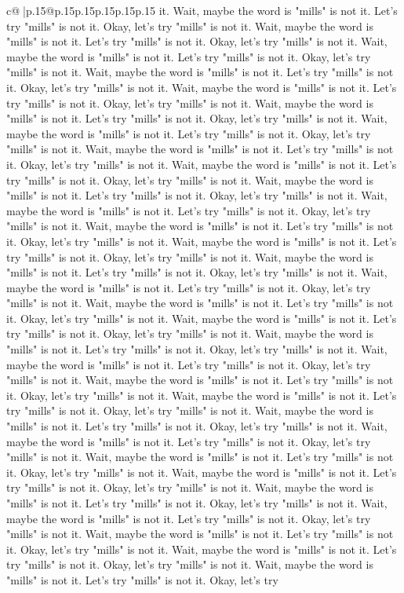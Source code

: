 \documentclass{article}
\begin{document}
{\begin{supertabular}{c@{$\;$}|p{.15\linewidth}@{}p{.15\linewidth}p{.15\linewidth}p{.15\linewidth}p{.15\linewidth}p{.15\linewidth}}
{{{it. Wait, maybe the word is "mills" is not it. Let's try "mills" is not it. Okay, let's try "mills" is not it. Wait, maybe the word is "mills" is not it. Let's try "mills" is not it. Okay, let's try "mills" is not it. Wait, maybe the word is "mills" is not it. Let's try "mills" is not it. Okay, let's try "mills" is not it. Wait, maybe the word is "mills" is not it. Let's try "mills" is not it. Okay, let's try "mills" is not it. Wait, maybe the word is "mills" is not it. Let's try "mills" is not it. Okay, let's try "mills" is not it. Wait, maybe the word is "mills" is not it. Let's try "mills" is not it. Okay, let's try "mills" is not it. Wait, maybe the word is "mills" is not it. Let's try "mills" is not it. Okay, let's try "mills" is not it. Wait, maybe the word is "mills" is not it. Let's try "mills" is not it. Okay, let's try "mills" is not it. Wait, maybe the word is "mills" is not it. Let's try "mills" is not it. Okay, let's try "mills" is not it. Wait, maybe the word is "mills" is not it. Let's try "mills" is not it. Okay, let's try "mills" is not it. Wait, maybe the word is "mills" is not it. Let's try "mills" is not it. Okay, let's try "mills" is not it. Wait, maybe the word is "mills" is not it. Let's try "mills" is not it. Okay, let's try "mills" is not it. Wait, maybe the word is "mills" is not it. Let's try "mills" is not it. Okay, let's try "mills" is not it. Wait, maybe the word is "mills" is not it. Let's try "mills" is not it. Okay, let's try "mills" is not it. Wait, maybe the word is "mills" is not it. Let's try "mills" is not it. Okay, let's try "mills" is not it. Wait, maybe the word is "mills" is not it. Let's try "mills" is not it. Okay, let's try "mills" is not it. Wait, maybe the word is "mills" is not it. Let's try "mills" is not it. Okay, let's try "mills" is not it. Wait, maybe the word is "mills" is not it. Let's try "mills" is not it. Okay, let's try "mills" is not it. Wait, maybe the word is "mills" is not it. Let's try "mills" is not it. Okay, let's try "mills" is not it. Wait, maybe the word is "mills" is not it. Let's try "mills" is not it. Okay, let's try "mills" is not it. Wait, maybe the word is "mills" is not it. Let's try "mills" is not it. Okay, let's try "mills" is not it. Wait, maybe the word is "mills" is not it. Let's try "mills" is not it. Okay, let's try "mills" is not it. Wait, maybe the word is "mills" is not it. Let's try "mills" is not it. Okay, let's try "mills" is not it. Wait, maybe the word is "mills" is not it. Let's try "mills" is not it. Okay, let's try "mills" is not it. Wait, maybe the word is "mills" is not it. Let's try "mills" is not it. Okay, let's try "mills" is not it. Wait, maybe the word is "mills" is not it. Let's try "mills" is not it. Okay, let's try "mills" is not it. Wait, maybe the word is "mills" is not it. Let's try "mills" is not it. Okay, let's try "mills" is not it. Wait, maybe the word is "mills" is not it. Let's try "mills" is not it. Okay, let's try "mills" is not it. Wait, maybe the word is "mills" is not it. Let's try "mills" is not it. Okay, let's try "mills" is not it. Wait, maybe the word is "mills" is not it. Let's try "mills" is not it. Okay, let's try }}}
\end{supertabular}}
\end{document}
